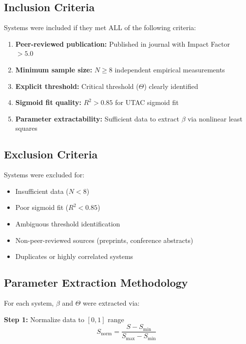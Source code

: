 \documentclass[11pt,a4paper]{article}
\begin{document}
\subsection{Inclusion Criteria}

Systems were included if they met ALL of the following criteria:

\begin{enumerate}
\item \textbf{Peer-reviewed publication:} Published in journal with Impact Factor $> 5.0$
\item \textbf{Minimum sample size:} $N \geq 8$ independent empirical measurements
\item \textbf{Explicit threshold:} Critical threshold ($\Theta$) clearly identified
\item \textbf{Sigmoid fit quality:} $R^2 > 0.85$ for UTAC sigmoid fit
\item \textbf{Parameter extractability:} Sufficient data to extract $\beta$ via nonlinear least squares
\end{enumerate}

\subsection{Exclusion Criteria}

Systems were excluded for:

\begin{itemize}
\item Insufficient data ($N < 8$)
\item Poor sigmoid fit ($R^2 < 0.85$)
\item Ambiguous threshold identification
\item Non-peer-reviewed sources (preprints, conference abstracts)
\item Duplicates or highly correlated systems
\end{itemize}

\subsection{Parameter Extraction Methodology}

For each system, $\beta$ and $\Theta$ were extracted via:

\textbf{Step 1:} Normalize data to $[0, 1]$ range
\begin{equation}
S_{\text{norm}} = \frac{S - S_{\text{min}}}{S_{\text{max}} - S_{\text{min}}}
\end{equation}
\end{document}
